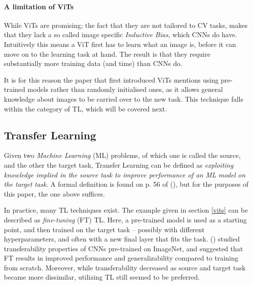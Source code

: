 \paragraph{A limitation of ViTs}
While ViTs are promising; the fact that they are not tailored to CV tasks, makes that they lack a so called image specific \textit{Inductive Bias}, which CNNs do have. Intuitively this means a ViT first has to learn what an image is, before it can move on to the learning task at hand. The result is that they require substantially more training data (and time) than CNNs do. 

It is for this reason the paper that first introduced ViTs \citep{dosovitskiy2020image} mentions using pre-trained models rather than randomly initialised ones, as it allows general knowledge about images to be carried over to the new task. This technique falls within the category of TL, which will be covered next.


\subsection{Transfer Learning}
Given two \textit{Machine Learning} (ML) problems, of which one is called the source, and the other the target task, Transfer Learning can be defined as \textit{exploiting knowledge implied in the source task to improve performance of an ML model on the target task}. A formal definition is found on p. 56 of \citeauthor{sabatelli2022contributions} (\citeyear{sabatelli2022contributions}), but for the purposes of this paper, the one above suffices.

In practice, many TL techniques exist. The example given in section \ref{vits} can be described as \textit{fine-tuning} (FT) TL. Here, a pre-trained model is used as a starting point, and then trained on the target task -- possibly with different hyperparameters, and often with a new final layer that fits the task. \citeauthor{yosinski2014transferable} (\citeyear{yosinski2014transferable}) studied transferability properties of CNNs pre-trained on ImageNet, and suggested that FT results in improved performance and generalizability compared to training from scratch. Moreover, while transferability decreased as source and target task became more dissimilar, utilizing TL still seemed to be preferred.

